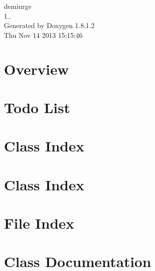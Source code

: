 \documentclass{book}
\begin{document}
\hypersetup{pageanchor=false,citecolor=blue}
\begin{titlepage}
\vspace*{7cm}
\begin{center}
{\Large demiurge \\[1ex]\large 1.. }\\
\vspace*{1cm}
{\large Generated by Doxygen 1.8.1.2}\\
\vspace*{0.5cm}
{\small Thu Nov 14 2013 15:15:46}\\
\end{center}
\end{titlepage}
\clearemptydoublepage
{}
\tableofcontents
\clearemptydoublepage
{}
\hypersetup{pageanchor=true,citecolor=blue}
\chapter{Overview}
\label{index}\hypertarget{index}{}
\chapter{Todo List}
\label{todo}
\hypertarget{todo}{}

\chapter{Class Index}

\chapter{Class Index}

\chapter{File Index}

\chapter{Class Documentation}






































\end{document}
